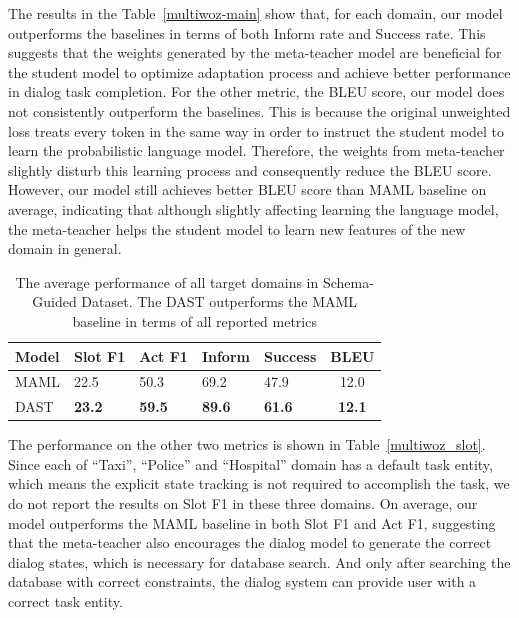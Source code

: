 \documentclass[letterpaper]{article} %
\begin{document}
The results in the Table~\ref{multiwoz-main} show that, for each domain, our model outperforms the baselines in terms of both Inform rate and Success rate. This suggests that the weights generated by the meta-teacher model are beneficial for the student model to optimize adaptation process and achieve better performance in dialog task completion.
%
For the other metric, the BLEU score, our model does not consistently outperform the baselines. This is because the original unweighted loss treats every token in the same way in order to instruct the student model to learn the probabilistic language model. Therefore, the weights from meta-teacher slightly disturb this learning process and consequently reduce the BLEU score. However, our model still achieves better BLEU score than MAML baseline on average, indicating that although slightly affecting learning the language model, the meta-teacher helps the student model to learn new features of the new domain in general.
%



\begin{table}[h]
\centering
\setlength{\extrarowheight}{0.06cm}
\small
\begin{tabular}[width=\columnwidth]{l|C{0.9cm}C{0.85cm}C{0.8cm}C{0.8cm}c}
    \toprule
    \hline
    \textbf{Model}  & Slot F1       &Act F1    & Inform      &Success     & BLEU\\
    \hline
    MAML    &  22.5&50.3&69.2&47.9   &12.0   \\
    DAST    & \textbf{23.2}&\textbf{59.5}&\textbf{89.6}&\textbf{61.6}&\textbf{12.1} \\
    \hline
    \bottomrule

\end{tabular}
\caption{The average performance of all target domains in Schema-Guided Dataset. The DAST outperforms the MAML baseline in terms of all reported metrics}
\label{schema}
\end{table}




The performance on the other two metrics is shown in Table~\ref{multiwoz_slot}.
Since each of ``Taxi'', ``Police'' and ``Hospital'' domain has a default task entity, which means the explicit state tracking is not required to accomplish the task, we do not report the results on Slot F1 in these three domains. On average, our model outperforms the MAML baseline in both Slot F1 and Act F1, suggesting that the meta-teacher also encourages the dialog model to generate the correct dialog states, which is necessary for database search. And only after searching the database with correct constraints, the dialog system can provide user with a correct task entity.
\end{document}
